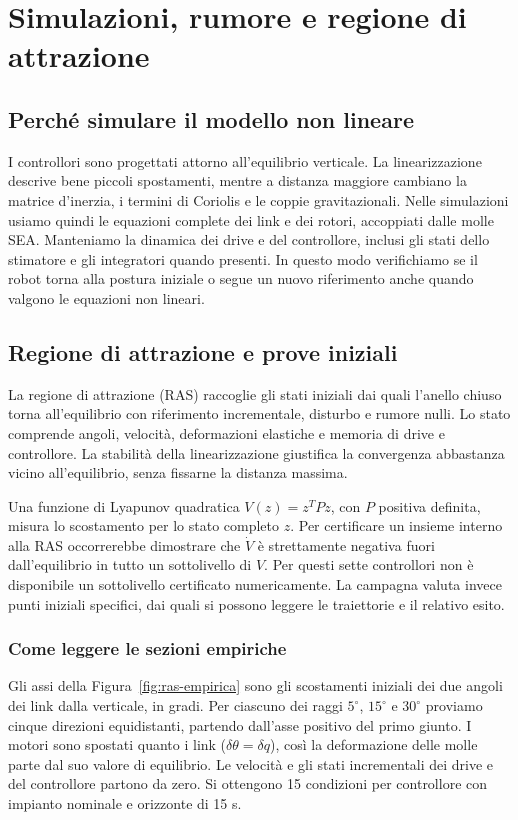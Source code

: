 \chapter{Simulazioni, rumore e regione di attrazione}

\section{Perché simulare il modello non lineare}
I controllori sono progettati attorno all'equilibrio verticale. La
linearizzazione descrive bene piccoli spostamenti, mentre a distanza
maggiore cambiano la matrice d'inerzia, i termini di Coriolis e le
coppie gravitazionali. Nelle simulazioni usiamo quindi le equazioni
complete dei link e dei rotori, accoppiati dalle molle SEA. Manteniamo
la dinamica dei drive e del controllore, inclusi gli stati dello
stimatore e gli integratori quando presenti. In questo modo verifichiamo
se il robot torna alla postura iniziale o segue un nuovo riferimento
anche quando valgono le equazioni non lineari.

\section{Regione di attrazione e prove iniziali}
La regione di attrazione (RAS) raccoglie gli stati iniziali dai quali
l'anello chiuso torna all'equilibrio con riferimento incrementale,
disturbo e rumore nulli. Lo stato comprende angoli, velocità,
deformazioni elastiche e memoria di drive e controllore. La stabilità
della linearizzazione giustifica la convergenza abbastanza vicino
all'equilibrio, senza fissarne la distanza massima.

Una funzione di Lyapunov quadratica $V(z)=z^T Pz$, con $P$ positiva
definita, misura lo scostamento per lo stato completo $z$. Per
certificare un insieme interno alla RAS occorrerebbe dimostrare che
$\dot V$ è strettamente negativa fuori dall'equilibrio in tutto un
sottolivello di $V$. Per questi sette controllori non è disponibile
un sottolivello certificato numericamente. La campagna valuta invece
punti iniziali specifici, dai quali si possono leggere le traiettorie
e il relativo esito.

\subsection{Come leggere le sezioni empiriche}
Gli assi della Figura~\ref{fig:ras-empirica} sono gli scostamenti iniziali
dei due angoli dei link dalla verticale, in gradi. Per ciascuno dei
raggi $5^\circ$, $15^\circ$ e $30^\circ$ proviamo cinque direzioni
equidistanti, partendo dall'asse positivo del primo giunto.
I motori sono spostati quanto i link ($\delta\theta=\delta q$), così
la deformazione delle molle parte dal suo valore di equilibrio.
Le velocità e gli stati incrementali dei drive e del controllore
partono da zero. Si ottengono 15 condizioni per controllore con
impianto nominale e orizzonte di 15 s.

